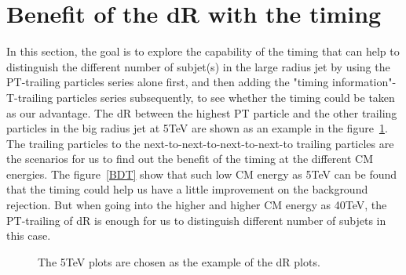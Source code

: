 \section{Benefit of the dR with the timing}
\label{sec:Def_timing}
In this section, the goal is to explore the capability of the timing that can help to distinguish the different number of subjet(s) in the large radius jet by using the PT-trailing particles series alone first, and then adding the "timing information"-T-trailing particles series subsequently, to see whether the timing could be taken as our advantage. The dR between the highest PT particle and the other trailing particles in the big radius jet at 5TeV are shown as an example in the figure~\ref{dR_5TeV}.\\

The trailing particles to the next-to-next-to-next-to-next-to trailing particles are the scenarios for us to find out the benefit of the timing at the different CM energies. The figure~\ref{BDT} show that such low CM energy as 5TeV can be found that the timing could help us have a little improvement on the background rejection. But when going into the higher and higher CM energy as 40TeV, the PT-trailing of dR is enough for us to distinguish different number of subjets in this case. 

\begin{figure}
\begin{center}
\end{center}
\caption{The 5TeV plots are chosen as the example of the dR plots. }
\label{dR_5TeV}
\end{figure}

